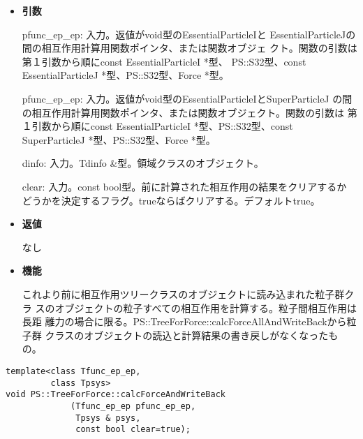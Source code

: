 \begin{itemize}

\item {\bf 引数}

pfunc\_ep\_ep: 入力。返値がvoid型のEssentialParticleIと
EssentialParticleJの間の相互作用計算用関数ポインタ、または関数オブジェ
クト。関数の引数は第１引数から順にconst EssentialParticleI *型、
PS::S32型、const EssentialParticleJ *型、PS::S32型、Force *型。

pfunc\_ep\_ep: 入力。返値がvoid型のEssentialParticleIとSuperParticleJ
の間の相互作用計算用関数ポインタ、または関数オブジェクト。関数の引数は
第１引数から順にconst EssentialParticleI *型、PS::S32型、const
SuperParticleJ *型、PS::S32型、Force *型。

dinfo: 入力。Tdinfo \&型。領域クラスのオブジェクト。

clear: 入力。const bool型。前に計算された相互作用の結果をクリアするか
どうかを決定するフラグ。trueならばクリアする。デフォルトtrue。

\item {\bf 返値}

なし

\item {\bf 機能}

これより前に相互作用ツリークラスのオブジェクトに読み込まれた粒子群クラ
スのオブジェクトの粒子すべての相互作用を計算する。粒子間相互作用は長距
離力の場合に限る。PS::TreeForForce::calcForceAllAndWriteBackから粒子群
クラスのオブジェクトの読込と計算結果の書き戻しがなくなったもの。

\end{itemize}


\begin{screen}
\begin{verbatim}
template<class Tfunc_ep_ep,
         class Tpsys>
void PS::TreeForForce::calcForceAndWriteBack
             (Tfunc_ep_ep pfunc_ep_ep,
              Tpsys & psys,
              const bool clear=true);
\end{verbatim}
\end{screen}

